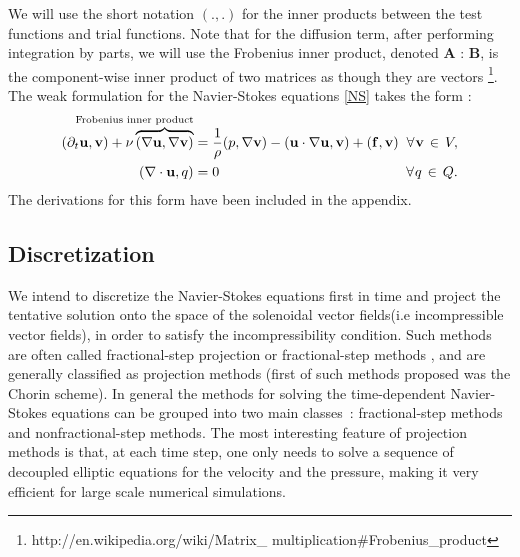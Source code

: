 \documentclass[11pt]{article}
\begin{document}
{We will use the short notation $(.,.)$ for the inner products between the test functions and trial 
functions. Note that for the diffusion term, after performing integration by parts, we will use
the Frobenius inner product, denoted \textbf{A} : \textbf{B}, is the component-wise inner 
product of two matrices as though they are vectors 
\footnote{http://en.wikipedia.org/wiki/Matrix\_ \hspace{-0.65mm}multiplication\#Frobenius\_product}. 
The weak formulation for the Navier-Stokes equations \eqref{NS} takes the form :
\begin{align}
\label{weakNS}
(\partial_t \mathbf{u},\mathbf{v}) 
+ \nu\overbrace{(\nabla\mathbf{u},\nabla\mathbf{v})}^{\hidewidth{\text{Frobenius inner product}}}  &= 
\frac{1}{\rho} (p,\nabla \mathbf{v}) 
- (\mathbf{u}\cdot \nabla\mathbf{u},\mathbf{v}) 
+ (\mathbf{f},\mathbf{v}) \hspace{2mm}\forall \hspace{0.25mm}\mathbf{v} \hspace{0.5mm}\in \hspace{0.5mm} V,
\\
\label{weakContinuity}
(\nabla\cdot\mathbf{u},q) & = 0  \hspace{47mm}\forall \hspace{0.25mm}q \hspace{0.5mm}\in \hspace{0.5mm} Q. 
\end{align}
The derivations for this form have been included in the appendix.



\subsection{Discretization}
We intend to discretize the Navier-Stokes equations first in time and project the tentative 
solution onto the space of the solenoidal vector fields(i.e incompressible vector fields), 
in order to satisfy the incompressibility condition. Such methods are often called 
fractional-step projection or fractional-step methods \cite{4}, and are generally classified
as projection methods \cite{6} (first of such methods proposed was the Chorin scheme). 
In general the methods for solving the time-dependent Navier-Stokes equations can be 
grouped into two main \mbox{classes :} fractional-step methods and nonfractional-step 
methods. The most interesting feature of projection methods is that, at each time step, 
one only needs to solve a sequence of decoupled elliptic equations for the velocity and 
the pressure, making it very efficient for large scale numerical simulations\cite{6}. \\

}
\end{document}
